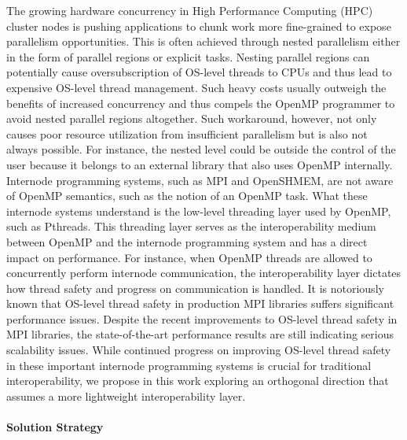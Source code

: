 The growing hardware concurrency in High Performance Computing (HPC)
cluster nodes is pushing applications to chunk work more fine-grained
to expose parallelism opportunities.  This is often achieved through
nested parallelism either in the form of parallel regions or explicit
tasks.  Nesting parallel regions can potentially cause
oversubscription of OS-level threads to CPUs and thus lead to
expensive OS-level thread management.  Such heavy costs usually
outweigh the benefits of increased concurrency and thus compels the
OpenMP programmer to avoid nested parallel regions altogether.  Such
workaround, however, not only causes poor resource utilization from
insufficient parallelism but is also not always possible.  For
instance, the nested level could be outside the control of the user
because it belongs to an external library that also uses OpenMP
internally.  Internode programming systems, such as MPI and OpenSHMEM,
are not aware of OpenMP semantics, such as the notion of an OpenMP
task.  What these internode systems understand is the low-level
threading layer used by OpenMP, such as Pthreads.  This threading
layer serves as the interoperability medium between OpenMP and the
internode programming system and has a direct impact on performance.
For instance, when OpenMP threads are allowed to concurrently perform
internode communication, the interoperability layer dictates how
thread safety and progress on communication is handled.  It is
notoriously known that OS-level thread safety in production MPI
libraries suffers significant performance issues.  Despite the recent
improvements to OS-level thread safety in MPI libraries, the
state-of-the-art performance results are still indicating serious
scalability issues.  While continued progress on improving OS-level
thread safety in these important internode programming systems is
crucial for traditional interoperability, we propose in this work
exploring an orthogonal direction that assumes a more lightweight
interoperability layer.

\paragraph{Solution Strategy}

